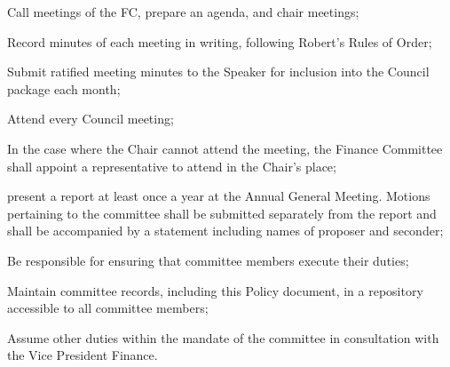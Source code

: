 \begin{longenum}[ label*=\thesubsection.\arabic*., align=left]
\begin{longenum}[ label*=\arabic*., align=left]
\begin{longenum}[ label*=\arabic*., align=left]
\begin{longenum}[ label*=\arabic*., align=left]
			\end{longenum}
		\item Call meetings of the FC, prepare an agenda, and chair meetings;
		\item Record minutes of each meeting in writing, following Robert's Rules of Order;
			\begin{longenum}[ label*=\arabic*., align=left]
			\item Submit ratified meeting minutes to the Speaker for inclusion into the Council package each month;
			\end{longenum}
		\item Attend every Council meeting;
			\begin{longenum}[ label*=\arabic*., align=left]
			\item In the case where the Chair cannot attend the meeting, the Finance Committee shall appoint a representative to attend in the Chair's place;
			\item present a report at least once a year at the Annual General Meeting. Motions pertaining to the committee shall be submitted separately from the report and shall be accompanied by a statement including names of proposer and seconder;
			\end{longenum}
		\item Be responsible for ensuring that committee members execute their duties;
		\item Maintain committee records, including this Policy document, in a repository accessible to all committee members;
		\item Assume other duties within the mandate of the committee in consultation with the Vice President Finance.
		\end{longenum}
	\end{longenum}
\end{longenum}

